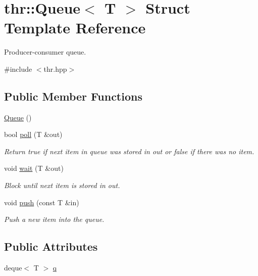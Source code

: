 \hypertarget{structthr_1_1_queue}{\section{thr\-:\-:Queue$<$ T $>$ Struct Template Reference}
\label{structthr_1_1_queue}
}


Producer-\/consumer queue.  




{\ttfamily \#include $<$thr.\-hpp$>$}

\subsection*{Public Member Functions}
\begin{DoxyCompactItemize}
\item 
\hyperlink{structthr_1_1_queue_a5b21c17bdad3f7d88f7a30f92a2bd42d}{Queue} ()
\item 
bool \hyperlink{structthr_1_1_queue_a1ce03f6aee29d5dc8e4b3a247de063e5}{poll} (T \&out)
\begin{DoxyCompactList}\small\item\em Return {\ttfamily true} if next item in queue was stored in {\ttfamily out} or {\ttfamily false} if there was no item. \end{DoxyCompactList}\item 
void \hyperlink{structthr_1_1_queue_ab095129fe0ba3dc63fa7300ffe2b11b9}{wait} (T \&out)
\begin{DoxyCompactList}\small\item\em Block until next item is stored in {\ttfamily out}. \end{DoxyCompactList}\item 
void \hyperlink{structthr_1_1_queue_a62768ce373068fa4b3baf574f5fed995}{push} (const T \&in)
\begin{DoxyCompactList}\small\item\em Push a new item into the queue. \end{DoxyCompactList}\end{DoxyCompactItemize}
\subsection*{Public Attributes}
\begin{DoxyCompactItemize}
\item 
deque$<$ T $>$ \hyperlink{structthr_1_1_queue_aecde97de4091b83a35dcf2ec42cdcd7b}{q}
\end{DoxyCompactItemize}
